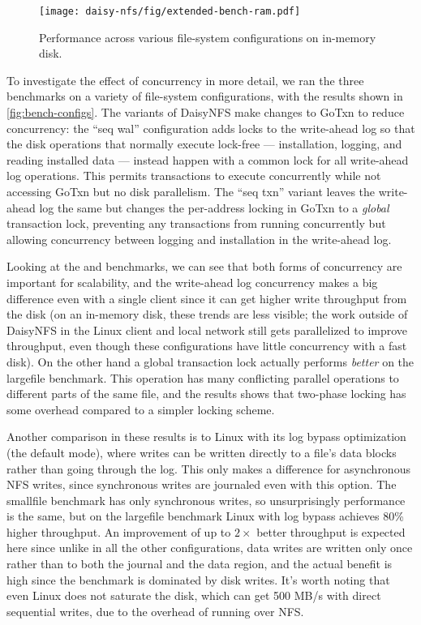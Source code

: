 \begin{figure}[hp]
  \texttt{[image: daisy-nfs/fig/extended-bench-ram.pdf]}
  \caption{Performance across various file-system configurations on in-memory disk.}
  \label{fig:bench-configs-ram}
\end{figure}


To investigate the effect of concurrency in more detail, we ran the three
benchmarks on a variety of file-system configurations, with the results shown in
\cref{fig:bench-configs}.
The variants of DaisyNFS make changes to GoTxn to reduce concurrency: the
``seq wal'' configuration adds locks to the write-ahead log so that the
disk operations that normally execute lock-free --- installation, logging, and
reading installed data --- instead happen with a common lock for all write-ahead
log operations. This permits transactions to execute concurrently while not
accessing GoTxn but no disk parallelism. The ``seq txn'' variant leaves the
write-ahead log the same but changes the per-address locking in GoTxn to a
\emph{global} transaction lock, preventing any transactions from running
concurrently but allowing concurrency between logging and installation in the
write-ahead log.

Looking at the  and  benchmarks, we can see
that both forms of concurrency are important for scalability, and the
write-ahead log concurrency makes a big difference even with a single client
since it can get higher write throughput from the disk (on an in-memory disk,
these trends are less visible; the work outside of DaisyNFS in the Linux client
and local network still gets parallelized to improve throughput, even though
these configurations have little concurrency with a fast disk). On the other
hand a global transaction lock actually performs \emph{better} on the largefile
benchmark. This operation has many conflicting parallel operations to different
parts of the same file, and the results shows that two-phase locking has some
overhead compared to a simpler locking scheme.

Another comparison in these results is to Linux with its log bypass optimization
(the default  mode), where writes can be written directly to a
file's data blocks rather than going through the log. This only makes a difference for asynchronous NFS
writes, since synchronous writes are journaled even with this option. The smallfile benchmark has only
synchronous writes, so unsurprisingly performance is the same, but on the
largefile benchmark Linux with log bypass achieves 80\% higher throughput. An
improvement of up to $2\times$ better throughput is expected here since unlike
in all the other configurations, data writes are written only once rather than
to both the journal and the data region, and the actual benefit is high since
the benchmark is dominated by disk writes. It's worth noting that even Linux
does not saturate the disk, which can get 500 MB/s with direct sequential
writes, due to the overhead of running over NFS.

